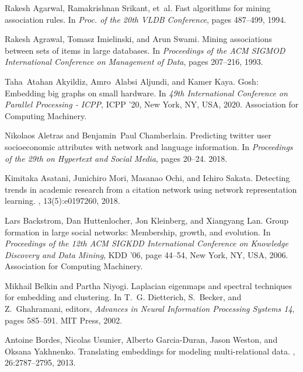 \documentclass{IEEEtran}
\begin{document}
 


\begin{thebibliography}{00}

Rakesh Agarwal, Ramakrishnan Srikant, et~al.
\newblock Fast algorithms for mining association rules.
\newblock In {\em Proc. of the 20th VLDB Conference}, pages 487--499, 1994.

Rakesh Agrawal, Tomasz Imielinski, and Arun Swami.
\newblock Mining associations between sets of items in large databases.
\newblock In {\em Proceedings of the ACM SIGMOD International Conference on
  Management of Data}, pages 207--216, 1993.

Taha~Atahan Akyildiz, Amro~Alabsi Aljundi, and Kamer Kaya.
\newblock Gosh: Embedding big graphs on small hardware.
\newblock In {\em 49th International Conference on Parallel Processing - ICPP},
  ICPP '20, New York, NY, USA, 2020. Association for Computing Machinery.

Nikolaos Aletras and Benjamin~Paul Chamberlain.
\newblock Predicting twitter user socioeconomic attributes with network and
  language information.
\newblock In {\em Proceedings of the 29th on Hypertext and Social Media}, pages
  20--24. 2018.

Kimitaka Asatani, Junichiro Mori, Masanao Ochi, and Ichiro Sakata.
\newblock Detecting trends in academic research from a citation network using
  network representation learning.
, 13(5):e0197260, 2018.

Lars Backstrom, Dan Huttenlocher, Jon Kleinberg, and Xiangyang Lan.
\newblock Group formation in large social networks: Membership, growth, and
  evolution.
\newblock In {\em Proceedings of the 12th ACM SIGKDD International Conference
  on Knowledge Discovery and Data Mining}, KDD '06, page 44–54, New York, NY,
  USA, 2006. Association for Computing Machinery.

Mikhail Belkin and Partha Niyogi.
\newblock Laplacian eigenmaps and spectral techniques for embedding and
  clustering.
\newblock In T.~G. Dietterich, S.~Becker, and Z.~Ghahramani, editors, {\em
  Advances in Neural Information Processing Systems 14}, pages 585--591. MIT
  Press, 2002.

Antoine Bordes, Nicolas Usunier, Alberto Garcia-Duran, Jason Weston, and Oksana
  Yakhnenko.
\newblock Translating embeddings for modeling multi-relational data.
,
  26:2787--2795, 2013.


\end{thebibliography}
\end{document}
